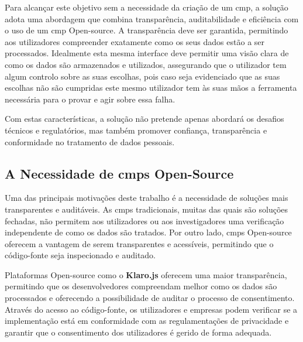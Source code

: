 Para alcançar este objetivo sem a necessidade da criação de um \acrshort{cmp}, a solução adota uma abordagem que combina transparência, auditabilidade e eficiência com o uso de um \acrshort{cmp} Open-source. A transparência deve ser garantida, permitindo aos utilizadores compreender exatamente como os seus dados estão a ser processados. Idealmente esta mesma interface deve permitir uma visão clara de como os dados são armazenados e utilizados, assegurando que o utilizador tem algum controlo sobre as suas escolhas, pois caso seja evidenciado que as suas escolhas não são cumpridas este mesmo utilizador tem às suas mãos a ferramenta necessária para o provar e agir sobre essa falha.

Com estas características, a solução não pretende apenas abordará os desafios técnicos e regulatórios, mas também promover confiança, transparência e conformidade no tratamento de dados pessoais.

\subsection{A Necessidade de \acrshort{cmp}s Open-Source}

Uma das principais motivações deste trabalho é a necessidade de soluções mais transparentes e auditáveis. As \acrshort{cmp}s tradicionais, muitas das quais são soluções fechadas, não permitem aos utilizadores ou aos investigadores uma verificação independente de como os dados são tratados. Por outro lado, \acrshort{cmp}s Open-source oferecem a vantagem de serem transparentes e acessíveis, permitindo que o código-fonte seja inspecionado e auditado.

Plataformas Open-source como o \textbf{Klaro.js} oferecem uma maior transparência, permitindo que os desenvolvedores compreendam melhor como os dados são processados e oferecendo a possibilidade de auditar o processo de consentimento. Através do acesso ao código-fonte, os utilizadores e empresas podem verificar se a implementação está em conformidade com as regulamentações de privacidade e garantir que o consentimento dos utilizadores é gerido de forma adequada.


